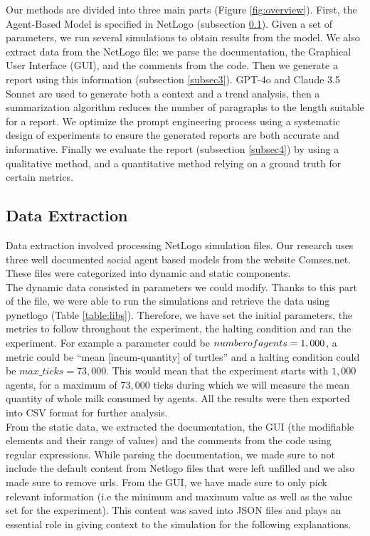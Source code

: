 \documentclass[preprint,12pt]{elsarticle}
\begin{document}
Our methods are divided into three main parts (Figure \ref{fig:overview}). First, the Agent-Based Model is specified in NetLogo (subsection \ref{subsec2}). Given a set of parameters, we run several simulations to obtain results from the model. We also extract data from the NetLogo file: we parse the documentation, the Graphical User Interface (GUI), and the comments from the code. Then we generate a report using this information (subsection \ref{subsec3}). GPT-4o and Claude 3.5 Sonnet are used to generate both a context and a trend analysis, then a summarization algorithm reduces the number of paragraphs to the length suitable for a report. We optimize the prompt engineering process using a systematic design of experiments to ensure the generated reports are both accurate and informative. Finally we evaluate the report (subsection \ref{subsec4}) by using a qualitative method, and a quantitative method relying on a ground truth for certain metrics. 


\subsection{Data Extraction}
\label{subsec2}


Data extraction involved processing NetLogo simulation files. Our research uses three well documented social agent based models from the website Comses.net. These files were categorized into dynamic and static components.\\

The dynamic data consisted in parameters we could modify. Thanks to this part of the file, we were able to run the simulations and retrieve the data using pynetlogo (Table \ref{table:libs}). Therefore, we have set the initial parameters, the metrics to follow throughout the experiment, the halting condition and ran the experiment. For example a parameter could be $number\-of\-agents = 1,000$, a metric could be “mean [incum-quantity] of turtles” and a halting condition could be $max\_ticks =73,000$. This would mean that the experiment starts with $1,000$ agents, for a maximum of $73,000$ ticks during which we will measure the mean quantity of whole milk consumed by agents. All the results were then exported into CSV format for further analysis.\\

From the static data, we extracted the documentation, the GUI (the modifiable elements and their range of values) and the comments from the code using regular expressions. While parsing the documentation, we made sure to not include the default content from Netlogo files that were left unfilled and we also made sure to remove urls. From the GUI, we have made sure to only pick relevant information (i.e the minimum and maximum value as well as the value set for the experiment). This content was saved into JSON files and plays an essential role in giving context to the simulation for the following explanations. 
\end{document}
